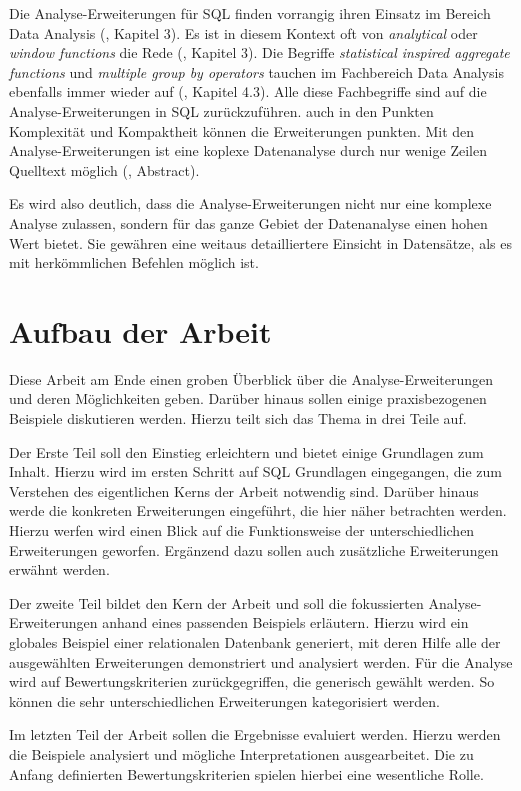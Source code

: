 Die Analyse-Erweiterungen für SQL finden vorrangig ihren Einsatz im Bereich Data
Analysis (\cite{FOTACHE2015243}, Kapitel 3). Es ist in diesem Kontext oft von \textit{analytical}
oder \textit{window functions} die Rede (\cite{FOTACHE2015243}, Kapitel 3). Die Begriffe
\textit{statistical inspired aggregate functions} und \textit{multiple group by
operators} tauchen im Fachbereich Data Analysis ebenfalls immer wieder auf (\cite{FOTACHE2015243},
Kapitel 4.3). Alle diese Fachbegriffe sind auf die Analyse-Erweiterungen in SQL zurückzuführen.
auch in den Punkten Komplexität und Kompaktheit können die Erweiterungen punkten.
Mit den Analyse-Erweiterungen ist eine koplexe Datenanalyse durch nur wenige Zeilen
Quelltext möglich (\cite{Maue2022}, Abstract).

Es wird also deutlich, dass die Analyse-Erweiterungen nicht nur eine komplexe Analyse
zulassen, sondern für das ganze Gebiet der Datenanalyse einen hohen Wert bietet.
Sie gewähren eine weitaus detailliertere Einsicht in Datensätze, als es mit
herkömmlichen Befehlen möglich ist.

\section{Aufbau der Arbeit}
Diese Arbeit am Ende einen groben Überblick über die Analyse-Erweiterungen und
deren Möglichkeiten geben. Darüber hinaus sollen einige praxisbezogenen Beispiele
diskutieren werden. Hierzu teilt sich das Thema in drei Teile auf.

Der Erste Teil soll den Einstieg erleichtern und bietet einige Grundlagen zum
Inhalt. Hierzu wird im ersten Schritt auf SQL Grundlagen eingegangen, die zum
Verstehen des eigentlichen Kerns der Arbeit notwendig sind. Darüber hinaus werde
die konkreten Erweiterungen eingeführt, die hier näher betrachten werden. Hierzu
werfen wird einen Blick auf die Funktionsweise der unterschiedlichen Erweiterungen
geworfen. Ergänzend dazu sollen auch zusätzliche Erweiterungen erwähnt werden.

Der zweite Teil bildet den Kern der Arbeit und soll die fokussierten Analyse-Erweiterungen
anhand eines passenden Beispiels erläutern. Hierzu wird ein globales Beispiel einer
relationalen Datenbank generiert, mit deren Hilfe alle der ausgewählten
Erweiterungen demonstriert und analysiert werden. Für die Analyse wird auf Bewertungskriterien
zurückgegriffen, die generisch gewählt werden. So können die sehr unterschiedlichen
Erweiterungen kategorisiert werden.

Im letzten Teil der Arbeit sollen die Ergebnisse evaluiert werden. Hierzu werden
die Beispiele analysiert und mögliche Interpretationen ausgearbeitet. Die zu Anfang
definierten Bewertungskriterien spielen hierbei eine wesentliche Rolle.

